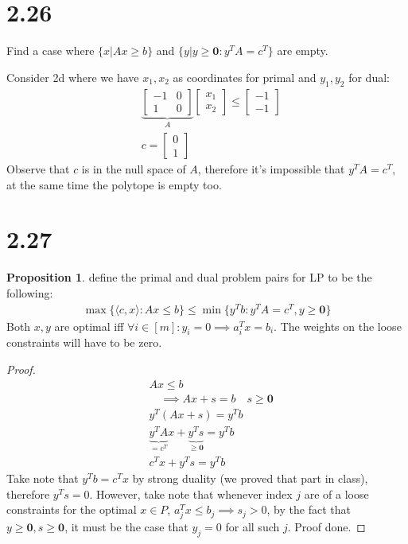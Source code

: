 \documentclass[]{article}
\theoremstyle{definition}
\newtheorem{prop}{Proposition}[section]  %
\begin{document}
\section*{2.26}
    Find a case where $\{x|Ax \ge b\}$ and $\{y| y\ge \mathbf 0: y^TA = c^T\}$ are empty.
    \par
    Consider 2d where we have $x_1, x_2$ as coordinates for primal and $y_1, y_2$ for dual: 
    \begin{align}
        &
       \underbrace{ \begin{bmatrix}
            -1 & 0
            \\
            1 & 0
        \end{bmatrix}}_{A}
        \begin{bmatrix}
            x_1 \\ x_2 
        \end{bmatrix} \le 
        \begin{bmatrix}
            -1 \\ -1
        \end{bmatrix}
        \\
        & 
        c = \begin{bmatrix}
            0 \\ 1
        \end{bmatrix}
    \end{align}
    Observe that $c$ is in the null space of $A$, therefore it's impossible that $y^TA = c^T$, at the same time the polytope is empty too. 
\section*{2.27}
    \begin{prop}
        define the primal and dual problem pairs for LP to be the following: 
        \begin{align}
            \max\{\langle c, x\rangle: Ax \le b\} \le 
            \min\{
                y^Tb: y^TA = c^T, y \ge \mathbf 0    
            \}
        \end{align}
        Both $x, y$ are optimal iff $\forall i \in [m]: y_i = 0\implies a_i^Tx = b_i$. The weights on the loose constraints will have to be zero. 
    \end{prop}
    \begin{proof}
        \begin{align}
            & Ax \le b
            \\
            & \quad \implies
            Ax + s = b \quad s \ge \mathbf 0    
            \\
            & y^T(Ax + s) = y^Tb
            \\
            & \underbrace{y^TA}_{=c^T} x + \underbrace{y^Ts}_{\ge \mathbf 0} = y^Tb
            \\
            & c^Tx + y^Ts = y^Tb
        \end{align}
        Take note that $y^Tb = c^Tx$ by strong duality (we proved that part in class), therefore $y^Ts = 0$. However, take note that whenever index $j$ are of a loose constraints for the optimal $x\in P$, $a_j^Tx \le b_j \implies s_j > 0$, by the fact that $y\ge \mathbf 0, s \ge \mathbf 0$, it must be the case that $y_j = 0$ for all such $j$. Proof done. 
    \end{proof}
\end{document}
